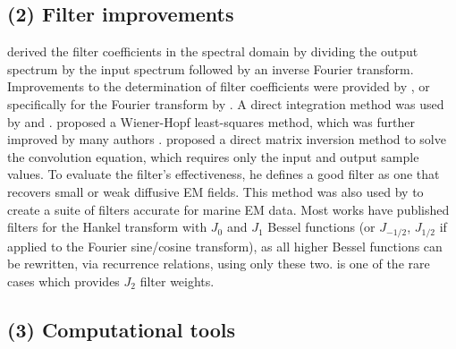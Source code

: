 \documentclass[a4paper, twoside, parskip, 10pt]{scrartcl}
\begin{document}
\begin{multicols}{2}
\subsection{(2) Filter improvements}

\cite{PhD.70.Ghosh} derived the filter coefficients in the spectral domain by
dividing the output spectrum by the input spectrum followed by an inverse
Fourier transform. Improvements to the determination of filter coefficients
were provided by \cite{EXG.75.ONeill, GEO.77.Nyman, GEO.82.Das}, or
specifically for the Fourier transform by \cite{GP.86.Nissen}. A direct
integration method was used by \cite{GP.76.Bichara} and \cite{GP.78.Bernabini}.
\cite{GP.79.Koefoed} proposed a Wiener-Hopf least-squares method, which was
further improved by many authors \citep{GP.82.Guptasarma, GEO.1982.Murakami,
GP.97.Guptasarma}. \cite{GP.07.Kong} proposed a direct matrix inversion method
to solve the convolution equation, which requires only the input and output
sample values. To evaluate the filter's effectiveness, he defines a good filter
as one that recovers small or weak diffusive EM fields. This method was also
used by \cite{GEO.09.Key, GEO.12.Key} to create a suite of filters accurate for
marine EM data. Most works have published filters for the Hankel transform with
$J_0$ and $J_1$ Bessel functions (or $J_{-1/2}$, $J_{1/2}$ if applied to the
Fourier sine/cosine transform), as all higher Bessel functions can be
rewritten, via recurrence relations, using only these two. \cite{GP.94.Mohsen}
is one of the rare cases which provides $J_2$ filter weights.

\subsection{(3) Computational tools}


\end{multicols}
\end{document}
